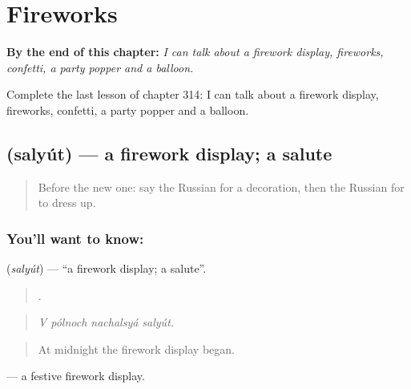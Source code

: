 
\chapter{Fireworks}
\label{ch:ru-fireworks}

\begin{chapteropening}
\textbf{By the end of this chapter:} \emph{I can talk about a firework display, fireworks, confetti, a party popper and a balloon.}

Complete the last lesson of chapter 314: I can talk about a firework display, fireworks, confetti, a party popper and a balloon.
\end{chapteropening}

\section[\texorpdfstring{\ru{салют} (salyút)}{салют (salyút)}]{ (salyút) — a firework display; a salute}

\label{lesson:RU-C314-salyut}



\begin{quote}
Before the new one: say the Russian for a decoration, then the Russian for to dress up.
\end{quote}

\subsection*{You'll want to know: }
\textbf{} (\emph{salyút}) — \textquotedblleft{}a firework display; a salute\textquotedblright{}.

\begin{quote}
   .
\end{quote}

\begin{quote}
\emph{V pólnoch nachalsyá salyút.}
\end{quote}

\begin{quote}
At midnight the firework display began.
\end{quote}

\emph{ } — a festive firework display.

